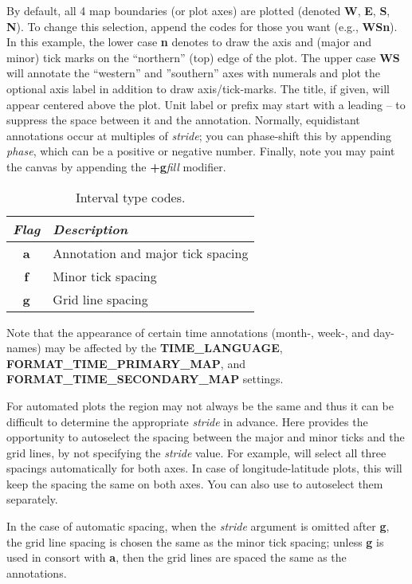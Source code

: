 By default, all 4 map boundaries (or plot axes) are plotted (denoted \textbf{W}, \textbf{E}, \textbf{S},
\textbf{N}).  To change this selection, append the codes for those you want
(e.g., \textbf{WSn}).  In this example, the lower case \textbf{n} denotes to draw the axis and (major and minor) tick marks on the ``northern'' (top) edge of the plot. The upper case \textbf{WS} will annotate the ``western'' and ''southern'' axes with numerals and plot the optional axis label in addition to
draw axis/tick-marks.  The title, if given, will appear centered above the plot.  Unit label or prefix may start with a
leading -- to suppress the space between it and the annotation.  Normally, equidistant annotations
occur at multiples of \emph{stride}; you can phase-shift this by appending \emph{phase}, which can be a
positive or negative number.  Finally, note you may paint the canvas by appending the \textbf{+g}\emph{fill} modifier.
\begin{table}[H]
\centering
\begin{tabular}{|c|l|} \hline
\emph{Flag}	& \emph{Description} \\ \hline
\textbf{a}	&	Annotation and major tick spacing \\ \hline
\textbf{f}	&	Minor tick spacing \\ \hline
\textbf{g}	&	Grid line spacing \\ \hline
\end{tabular}
\caption{Interval type codes.}
\label{tbl:inttype}
\end{table}
\noindent
Note that the appearance of certain time annotations (month-, week-, and day-names) may be affected
by the \textbf{TIME\_LANGUAGE}, \textbf{FORMAT\_TIME\_PRIMARY\_MAP}, and \textbf{FORMAT\_TIME\_SECONDARY\_MAP} settings.

For automated plots the region may not always be the same and thus it can be difficult to determine the appropriate \emph{stride} in advance. Here \GMT{} provides the opportunity to autoselect the spacing between the major and minor ticks and the grid lines, by not specifying the \emph{stride} value. For example,  will select all three spacings automatically for both axes. In case of longitude-latitude plots, this will keep the spacing the same on both axes. You can also use  to autoselect them separately.

In the case of automatic spacing, when the \emph{stride} argument is omitted after \textbf{g}, the grid line spacing is chosen the same as the minor tick spacing; unless \textbf{g} is used in consort with \textbf{a}, then the grid lines are spaced the same as the annotations.

